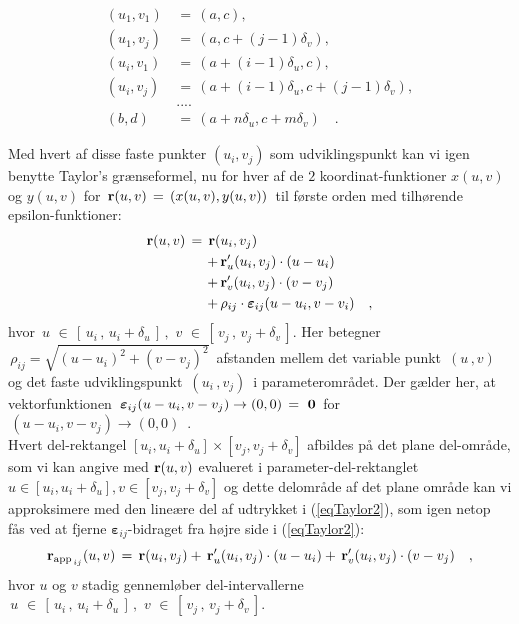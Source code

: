 \begin{equation}
\begin{aligned}
(u_{1}, v_{1}) \, &= \, (a, c), \\
(u_{1}, v_{j}) \, &= \, (a, c + (j-1)\delta_{v}), \\
(u_{i}, v_{1}) \, &= \, (a + (i-1)\delta_{u}, c), \\
(u_{i}, v_{j}) \, &= \, (a + (i-1)\delta_{u}, c + (j-1)\delta_{v}), \\
 &.... \\
(b, d) \, &= \, (a + n\delta_{u}, c + m\delta_{v}) \quad .
\end{aligned}
\end{equation}

Med hvert af disse faste punkter $(u_{i}, v_{j})$ som udviklingspunkt kan vi igen
benytte Taylor's grænseformel, nu for hver af de $2$  koordinat-funktioner $x(u,v)$ og $y(u,v)$  for $\,{\bf r}(u,
v) \, = \, \left(x(u,v), y(u,v)\right)\, $ til første orden med tilhørende epsilon-funktioner:
\begin{equation} \label{eqTaylor2}
\begin{aligned}
{\bf r}(u, v) \, = \, {\bf r}(& u_{i}, v_{j}) \\
+ \, &{\bf r}'_{u}(u_{i}, v_{j})\cdot(u-u_{i}) \\
+ \, &{\bf r}'_{v}(u_{i}, v_{j})\cdot(v-v_{j}) \\
+ \, &\rho_{ij}\cdot {\bm{\varepsilon}}_{ij}(u-u_{i}, v-v_{i}) \quad
,
\end{aligned}
\end{equation}
hvor  $\, u\, \, \in\, \left[\, u_{i}\, , \,  u_{i} +
\delta_{u}\,\right]\, , \,\, v\, \, \in\, \left[\, v_{j}\, , \,
v_{j} + \delta_{v}\,\right] .$ Her betegner  $\, \rho_{ij} =
\sqrt{(u - u_{i})^{2} + (v - v_{j})^{2}}\, $ afstanden mellem det
variable punkt $\,(u\,, v)\,$ og det faste udviklingspunkt
$\,(u_{i}\,,v_{j})\,$ i parameterområdet. Der gælder her, at vektorfunktionen
$\,{\bm{\varepsilon}}_{ij}(u-u_{i}, v-v_{j}) \to (0, 0)\, = \
{\bf{0}}\,$ for $\,(u-u_{i}, v-v_{j}) \to (0, 0)\,$ . \\


Hvert del-rektangel $[u_{i}, u_{i}+\delta_{u}]\times[v_{j},
v_{j}+\delta_{v}]$ afbildes på det plane del-område, som vi kan angive med ${\bf r}(u,v)$ evalueret i parameter-del-rektanglet
$u \in[u_{i}, u_{i}+\delta_{u}], v \in[v_{j}, v_{j}+\delta_{v}]$ og
dette delområde af det plane område kan vi approksimere med den lineære del af
udtrykket i (\ref{eqTaylor2}), som igen netop fås ved at fjerne
${\bm{\varepsilon}}_{ij}$-bidraget fra højre side i
(\ref{eqTaylor2}):
\begin{equation}\label{eqApp2}
{\bf r}_{\operatorname{app}_{\,ij}}(u, v) \, = \, {\bf r}(u_{i}, v_{j}) + \, {\bf
r}'_{u}(u_{i}, v_{j})\cdot (u - u_{i}) + \, {\bf r}'_{v}(u_{i},
v_{j})\cdot (v - v_{j}) \quad ,
\end{equation}
hvor $u$ og $v$ stadig gennemløber del-intervallerne $\, u\, \,
\in\, \left[\, u_{i}\, , \,  u_{i} + \delta_{u}\,\right]\, , \,\,
v\, \, \in\, \left[\, v_{j}\, , \, v_{j} + \delta_{v}\,\right] .$


